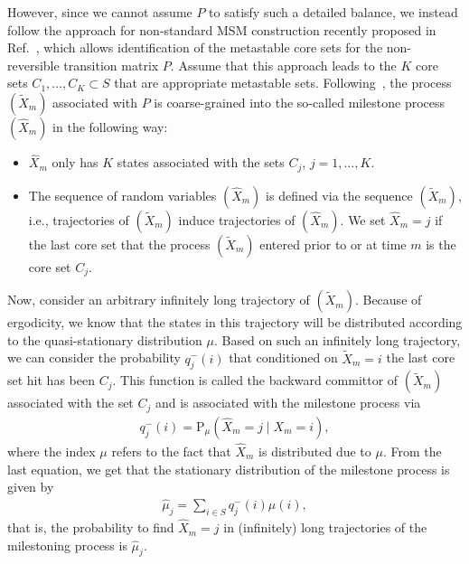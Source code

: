 \documentclass[journal=jctcce,manuscript=article]{achemso}
\newcommand{\recheck}[1]{{\color{red} #1}}
\newcommand{\bwd}[0]{-}
\newcommand{\prob}{\textrm{P}}
\begin{document}
However, since we cannot assume $P$ to satisfy such a detailed balance, we
instead follow the approach for non-standard MSM construction recently proposed in Ref.~\cite{sarich2014utilizing}, which allows  identification of the metastable core sets for the
non-reversible transition matrix $P$. Assume that this approach leads
to the $K$ core sets $C_1,\ldots, C_K\subset S$ that are appropriate metastable sets. 
Following~\cite{A19-31,schuette2011markov}, the process $(\tilde X_m)$ associated with $P$ is coarse-grained into the so-called milestone process $(\hat{X}_m)$ in the following way: 
\begin{itemize}
\item $\hat{X}_m$ only has $K$ states associated with the sets $C_j$, $j=1,\ldots,K$. 
\item The sequence of random variables $(\hat{X}_m)$ is defined via the sequence $(\tilde X_m)$, i.e., trajectories of $(\tilde X_m)$ induce trajectories of $(\hat{X}_m)$. We set $\hat{X}_m=j$ if the last core set that the process $(\tilde X_m)$ entered prior to or at time $m$ is the core set $C_j$.
\end{itemize}
Now, consider an arbitrary infinitely long trajectory of $(\tilde X_m)$. Because of ergodicity, we know that the states in this trajectory will be distributed according to the quasi-stationary distribution $\mu$. Based on such an infinitely long trajectory, we can consider the probability $q_j^\bwd(i)$ that conditioned on $\tilde X_m=i$ the last core set hit has been $C_j$.
This function is called the backward committor of $(\tilde X_m)$ associated with the set $C_j$ and is associated with the milestone process via
\begin{align}
\label{eq:msm-bwd-committor}  
q^\bwd_j(i)=\prob_\mu(\hat{X}_m=j \mid X_m=i),
\end{align}
where  the index $\mu$ refers to the fact that $\hat{X}_m$ is distributed due to $\mu$.
From the last equation, we get that the stationary distribution of the milestone process is given by
\begin{align}  
\hat{\mu}_j=\sum_{i\in S} q^\bwd_j(i)\mu(i),
\end{align}
that is, the probability to find $\hat{X}_m=j$ in (infinitely) long trajectories of the milestoning process is $\hat{\mu}_j$.
\end{document}
